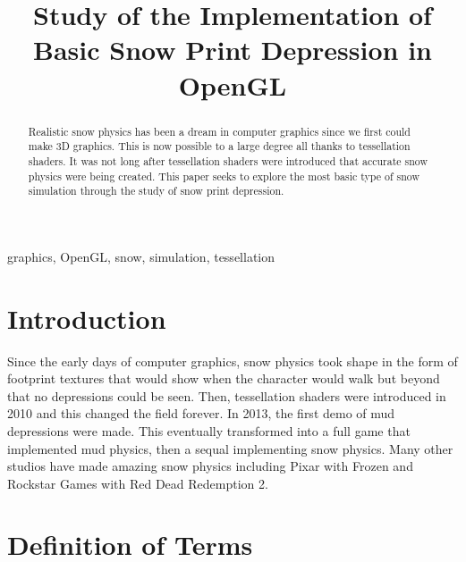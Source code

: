 \documentclass[conference]{IEEEtran}
\begin{document}
\title{Study of the Implementation of Basic Snow Print Depression in OpenGL}

\author{
\and
{}
}

\maketitle

\begin{abstract}
Realistic snow physics has been a dream in computer graphics since we first could make 3D graphics. This is now possible to a large degree all thanks to tessellation shaders. It was not long after tessellation shaders were introduced that accurate snow physics were being created. This paper seeks to explore the most basic type of snow simulation through the study of snow print depression.
\end{abstract}

\begin{IEEEkeywords}
graphics, OpenGL, snow, simulation, tessellation
\end{IEEEkeywords}

\section{Introduction}
Since the early days of computer graphics, snow physics took shape in the form of footprint textures that would show when the character would walk but beyond that no depressions could be seen. Then, tessellation shaders were introduced in 2010 and this changed the field forever. In 2013, the first demo of mud depressions were made. \cite{rendandsim} This eventually transformed into a full game that implemented mud physics, then a sequal implementing snow physics. Many other studios have made amazing snow physics including Pixar with Frozen and Rockstar Games with Red Dead Redemption 2.

\section{Definition of Terms}
\end{document}

